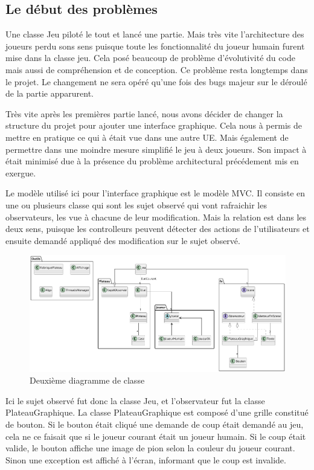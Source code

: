 \documentclass[12pt, legalpaper]{article}
\begin{document}
\subsection{Le début des problèmes}

Une classe Jeu piloté le tout et lancé une partie.
Mais très vite l'architecture des joueurs perdu sons sens puisque toute les fonctionnalité
du joueur humain furent mise dans la classe jeu. Cela posé beaucoup de problème d'évolutivité du code
mais aussi de compréhension et de conception. Ce problème resta longtemps dans le projet. 
Le changement ne sera opéré qu'une fois des bugs majeur sur le déroulé de la partie apparurent.
\\\par
Très vite après les premières partie lancé, nous avons décider de changer la structure du
projet pour ajouter une interface graphique. Cela nous à permis de mettre en pratique ce
qui à était vue dans une autre UE. Mais également de permettre dans une moindre mesure
simplifié le jeu à deux joueurs.
Son impact à était minimisé due à la présence du problème architectural précédement 
mis en exergue.
\\\par
Le modèle utilisé ici pour l'interface graphique est le modèle MVC. Il consiste en
une ou plusieurs classe qui sont les sujet observé qui vont rafraichir les observateurs,
les vue à chacune de leur modification. Mais la relation est dans les deux sens, puisque
les controlleurs peuvent détecter des actions de l'utilisateurs et ensuite demandé
appliqué des modification sur le sujet observé.

\begin{figure}[h]
    \includegraphics[scale=0.5]{othello2}
    \caption{Deuxième diagramme de classe}
\end{figure}

Ici le sujet observé fut donc la classe Jeu, et l'observateur fut la classe PlateauGraphique.
La classe PlateauGraphique est composé d'une grille constitué de bouton.
Si le bouton était cliqué une demande de coup était demandé au jeu, cela ne ce faisait
que si le joueur courant était un joueur humain. Si le coup était valide, le bouton
affiche une image de pion selon la couleur du joueur courant. Sinon une exception est
affiché à l'écran, informant que le coup est invalide.
\end{document}
